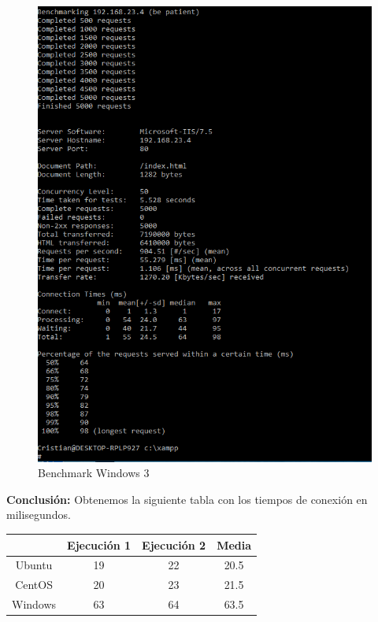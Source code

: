 \begin{enumerate}
		\begin{figure}[H] %
			\centering
			\includegraphics[scale=0.4]{pics/xamppWin3}  %
			\caption{Benchmark Windows 3} \label{fig:win3}
		\end{figure}
	
\end{enumerate}

\textbf{Conclusión:} Obtenemos la siguiente tabla con los tiempos de conexión en milisegundos.\\

\begin{center}
		\begin{tabular}{|c|c|c|c|}
		\hline 
		& Ejecución 1 & Ejecución 2 & Media \\ 
		\hline 
		Ubuntu & 19 & 22 & 20.5 \\ 
		\hline 
		CentOS & 20 & 23 & 21.5 \\ 
		\hline 
		Windows & 63 & 64 & 63.5 \\ 
		\hline 
	\end{tabular} 
\end{center}

